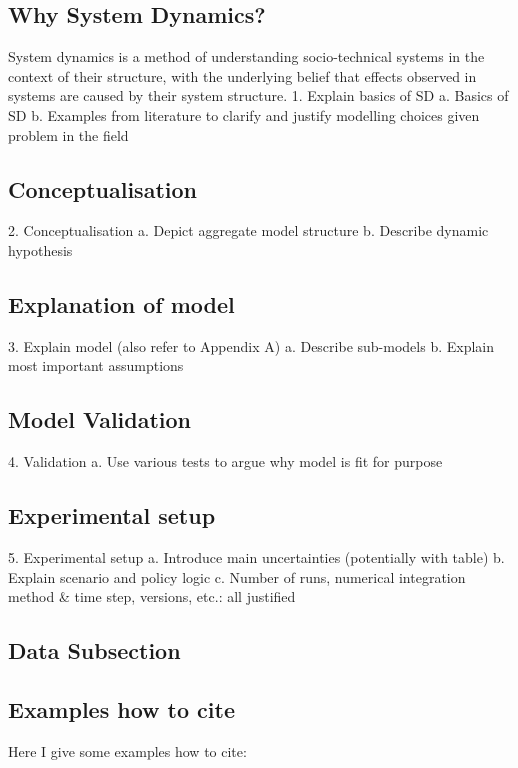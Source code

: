 
\subsection{Why System Dynamics?}
System dynamics is a method of understanding socio-technical systems in the context of their structure, with the underlying belief that effects observed in systems are caused by their system structure.
1.	Explain basics of SD
    a.	Basics of SD
    b.	Examples from literature to clarify and justify modelling choices given problem in the field
    
\subsection{Conceptualisation}
2.	Conceptualisation
    a.	Depict aggregate model structure
    b.	Describe dynamic hypothesis
    
\subsection{Explanation of model}
3.	Explain model (also refer to Appendix A)
    a.	Describe sub-models
    b.	Explain most important assumptions
    
\subsection{Model Validation}
4.	Validation
    a.	Use various tests to argue why model is fit for purpose
    
\subsection{Experimental setup}
5.	Experimental setup
    a.	Introduce main uncertainties (potentially with table)
    b.	Explain scenario and policy logic
    c.	Number of runs, numerical integration method & time step, versions, etc.: all justified

\subsection{Data Subsection}
\blindtext

\subsection*{Examples how to cite}

Here I give some examples how to cite:
\cite{moore_campylobacter_2005}
\parencite{moore_campylobacter_2005} 
\textcite{moore_campylobacter_2005}
\citeauthor{moore_campylobacter_2005}

